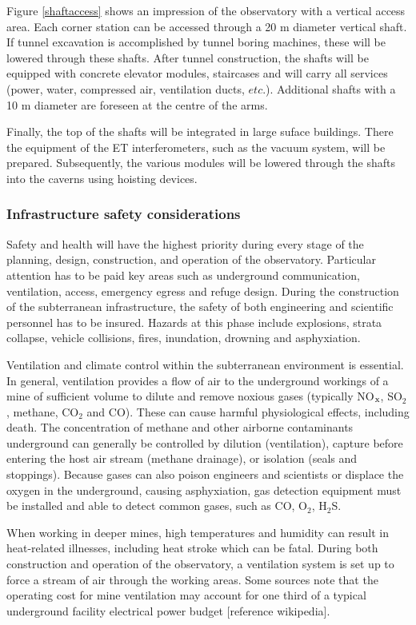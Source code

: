 Figure \ref{shaftaccess} shows an impression of the observatory with a vertical access area. Each corner station can be accessed through a 20 m diameter vertical shaft. If tunnel excavation is accomplished by tunnel boring machines, these will be lowered through these shafts. After tunnel construction, the shafts will be equipped with concrete elevator modules, staircases and will carry all services (power, water, compressed air, ventilation ducts, $etc.$). Additional shafts with a 10 m diameter are foreseen at the centre of the arms.

Finally, the top of the shafts will be integrated in large suface buildings. There the equipment of the ET interferometers, such as the vacuum system, will be prepared. Subsequently, the various modules will be lowered through the shafts into the caverns using hoisting devices.

\FloatBarrier
\subsubsection{Infrastructure safety considerations}
Safety and health will have the highest priority during every stage of the planning, design, construction, and operation of the observatory. Particular attention has to be paid key areas such as underground communication, ventilation, access, emergency egress and refuge design. During the construction of the subterranean infrastructure, the safety of both engineering and scientific personnel has to be insured. Hazards at this phase include explosions, strata collapse, vehicle collisions, fires, inundation, drowning and asphyxiation.

Ventilation and climate control within the subterranean environment is essential. In general, ventilation provides a flow of air to the underground workings of a mine of sufficient volume to dilute and remove noxious gases (typically NO$_{\rm{x}}$, SO$_2$, methane, CO$_2$ and CO). These can cause harmful physiological effects, including death. The concentration of methane and other airborne contaminants underground can generally be controlled by dilution (ventilation), capture before entering the host air stream (methane drainage), or isolation (seals and stoppings). Because gases can also poison engineers and scientists or displace the oxygen in the underground, causing asphyxiation, gas detection equipment must be installed and able to detect common gases, such as CO, O$_2$, H$_2$S. 

When working in deeper mines, high temperatures and humidity can result in heat-related illnesses, including heat stroke which can be fatal. During both construction and operation of the observatory, a ventilation system is set up to force a stream of air through the working areas. Some sources note that the operating cost for mine ventilation may account for one third of a typical underground facility electrical power budget [reference wikipedia].

